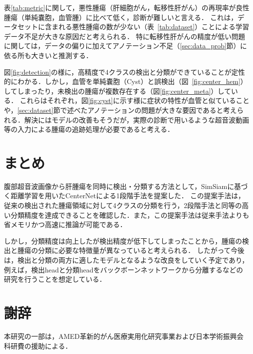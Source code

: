 \documentclass[a4j,8pt,twocolumn]{extarticle}
\begin{document}
        表\ref{tab:metric}に関して，悪性腫瘍（肝細胞がん，転移性肝がん）の再現率が良性腫瘍（単純嚢胞，血管腫）に比べて低く，診断が難しいと言える．
        これは，データセットに含まれる悪性腫瘍の数が少ない（表~\ref{tab:dataset}）ことによる学習データ不足が大きな原因だと考えられる．
        特に転移性肝がんの精度が低い問題に関しては，データの偏りに加えてアノテーション不足（\ref{sec:data_prob}節）に依る所も大きいと推測する．

        図\ref{fig:detection}の様に，高精度で4クラスの検出と分類ができていることが定性的にわかる．しかし，血管を単純嚢胞（Cyst）と誤検出（図~\ref{fig:center_hem}）してしまったり，未検出の腫瘍が複数存在する（図\ref{fig:center_meta}）している．
        これらはそれぞれ，図\ref{fig:cyst}に示す様に症状の特性が血管と似ていることや，\ref{sec:dataset}節で述べたアノテーションの問題が大きな要因であると考えられる．解決にはモデルの改善もそうだが，実際の診断で用いるような超音波動画等の入力による腫瘍の追跡処理が必要であると考える．

    \section{まとめ}
        腹部超音波画像から肝腫瘍を同時に検出・分類する方法として，SimSiamに基づく距離学習を用いたCenterNetによる1段階手法を提案した．
        この提案手法は，従来の検出された腫瘍領域に対して4クラスの分類を行う，2段階手法と同等の高い分類精度を達成できることを確認した．また，この提案手法は従来手法よりも省メモリかつ高速に推論が可能である．

        しかし，分類精度は向上したが検出精度が低下してしまったことから，腫瘍の検出と腫瘍の分類に必要な特徴量が異なっていると考えられる．
        したがって今後は，検出と分類の両方に適したモデルとなるような改良をしていく予定であり，例えば，検出headと分類headをバックボーンネットワークから分離するなどの研究を行うことを想定している．

    \section*{謝辞}
        本研究の一部は，AMED革新的がん医療実用化研究事業および日本学術振興会科研費の援助による．

    
    
\end{document}
